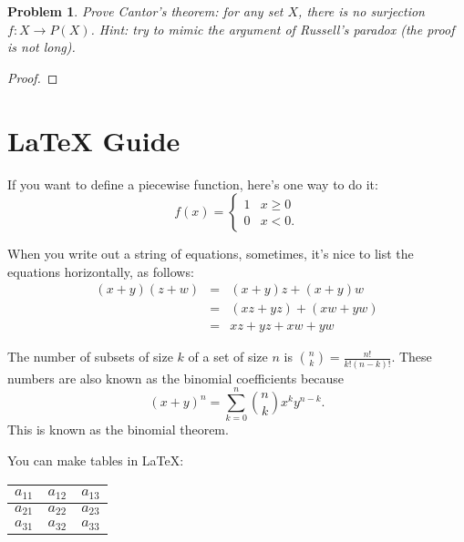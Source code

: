\documentclass[11pt]{article}
\newtheorem{problem}{Problem}
\theoremstyle{definition}
\theoremstyle{case}
\begin{document}
\begin{problem}
Prove Cantor's theorem: for any set $X$, there is no surjection $f:X\rightarrow P(X)$. Hint: try to mimic the argument of Russell's paradox (the proof is not long). 
\end{problem}

\begin{proof}

\end{proof}



\section{LaTeX Guide}

If you want to define a piecewise function, here's one way to do it: 
\[f(x)=\begin{cases}
1&x\ge0\\
0&x<0.
\end{cases}\]

When you write out a string of equations, sometimes, it's nice to list the equations horizontally, as follows: 
\[\begin{array}{ccl}
(x+y)(z+w)&=&(x+y)z+(x+y)w\\[2mm]
&=&(xz+yz)+(xw+yw)\\[2mm]
&=&xz+yz+xw+yw
\end{array}\]

The number of subsets of size $k$ of a set of size $n$ is ${n\choose k}=\frac{n!}{k!(n-k)!}$. These numbers are also known as the binomial coefficients because 
\[(x+y)^n=\sum_{k=0}^n{n\choose k}x^ky^{n-k}.\]
This is known as the binomial theorem. 

You can make tables in LaTeX: 

\begin{center}
\begin{tabular} {c|c|c}
$a_{11}$ &$a_{12}$ & $a_{13}$\\\hline
$a_{21}$&$a_{22}$&$a_{23}$\\\hline
$a_{31}$&$a_{32}$&$a_{33}$
\end{tabular}
\end{center}
\end{document}
